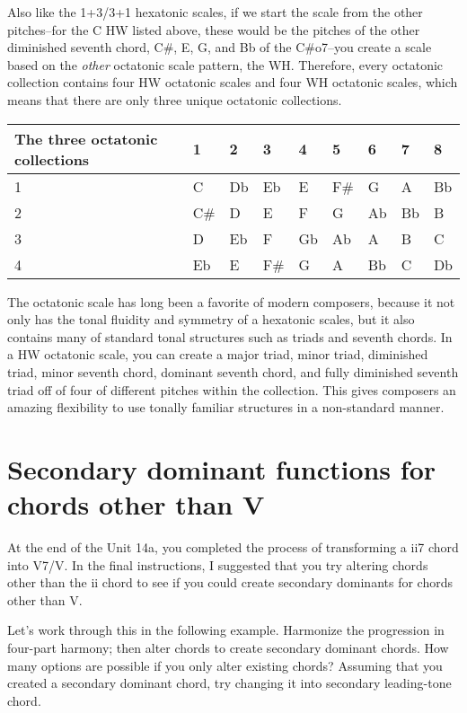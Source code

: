 \documentclass{book}
\begin{document}
Also like the 1+3/3+1 hexatonic scales, if we start the scale from the other
pitches--for the C HW listed above, these would be the pitches of the other
diminished seventh chord, C\#, E, G, and Bb of the C\#o7--you create a scale
based on the \emph{other} octatonic scale pattern, the WH. Therefore, every
octatonic collection contains four HW octatonic scales and four WH octatonic
scales, which means that there are only three unique octatonic collections.

\begin{longtable}[]{@{}lllllllll@{}}
\toprule
The three octatonic collections & 1 & 2 & 3 & 4 & 5 & 6 & 7 & 8 \\
\midrule
\endhead
1 & C & Db & Eb & E & F\# & G & A & Bb \\
2 & C\# & D & E & F & G & Ab & Bb & B \\
3 & D & Eb & F & Gb & Ab & A & B & C \\
4 & Eb & E & F\# & G & A & Bb & C & Db \\
\bottomrule
\end{longtable}

The octatonic scale has long been a favorite of modern composers, because it
not only has the tonal fluidity and symmetry of a hexatonic scales, but it
also contains many of standard tonal structures such as triads and seventh
chords. In a HW octatonic scale, you can create a major triad, minor triad,
diminished triad, minor seventh chord, dominant seventh chord, and fully
diminished seventh triad off of four of different pitches within the
collection. This gives composers an amazing flexibility to use tonally
familiar structures in a non-standard manner.

\hypertarget{secondary-dominant-functions-for-chords-other-than-v}{%
\section{Secondary dominant functions for chords other than
V}\label{secondary-dominant-functions-for-chords-other-than-v}}

At the end of the Unit 14a, you completed the process of transforming a ii7
chord into V7/V. In the final instructions, I suggested that you try altering
chords other than the ii chord to see if you could create secondary dominants
for chords other than V.

Let's work through this in the following example. Harmonize the progression in
four-part harmony; then alter chords to create secondary dominant chords. How
many options are possible if you only alter existing chords? Assuming that you
created a secondary dominant chord, try changing it into secondary
leading-tone chord.
\end{document}
